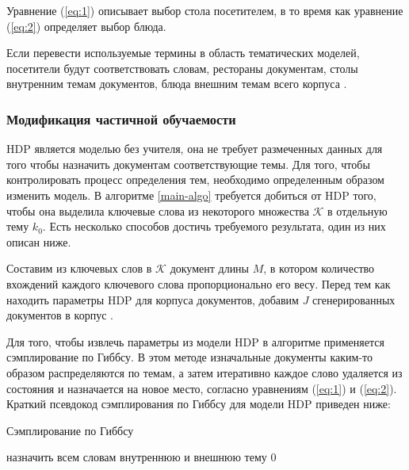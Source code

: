 \documentclass[12pt, a4paper]{article}
\begin{document}
  Уравнение (\ref{eq:1}) описывает выбор стола посетителем, в то время как уравнение (\ref{eq:2}) определяет выбор блюда.
  
  Если перевести используемые термины в область тематических моделей, посетители будут соответствовать словам, рестораны документам, столы внутренним темам документов, блюда внешним темам всего корпуса \cite{hdp-1}.
  
  \subsubsection{Модификация частичной обучаемости}
  HDP является моделью без учителя, она не требует размеченных данных для того чтобы назначить документам соответствующие темы. Для того, чтобы контролировать процесс определения тем, необходимо определенным образом изменить модель. В алгоритме \ref{main-algo} требуется добиться от HDP того, чтобы она выделила ключевые слова из некоторого множества $\mathcal{K}$ в отдельную тему $k_0$. Есть несколько способов достичь требуемого результата, один из них описан ниже.
  
	Составим из ключевых слов в $\mathcal{K}$ документ длины $M$, в котором количество вхождений каждого ключевого слова пропорционально его весу. Перед тем как находить параметры HDP для корпуса документов, добавим $J$ сгенерированных документов в корпус \cite{ss-learning}. 
	
  Для того, чтобы извлечь параметры из модели HDP в алгоритме применяется сэмплирование по Гиббсу. В этом методе изначальные документы каким-то образом распределяются по темам, а затем итеративно каждое слово удаляется из состояния и назначается на новое место, согласно уравнениям (\ref{eq:1}) и (\ref{eq:2}). Краткий псевдокод сэмплирования по Гиббсу для модели HDP приведен ниже:
  
  \begin{algorithm}[H]
  	\caption{Сэмплирование по Гиббсу}
    \SetAlgoLined
  	назначить всем словам внутреннюю и внешнюю тему $0$\;
  \end{algorithm}
  
\end{document}
